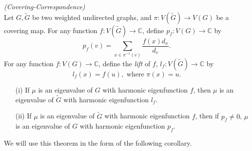 \begin{theorem}\label{thm:cov-cor}
\emph{(Covering-Correspondence)} \\
Let $G, \tilde{G}$ be two weighted undirected graphs, and $\pi : V(\tilde{G}) \to V(G)$ be a covering map.  For any function $f : V(\tilde{G}) \to \mathbb{C}$, define $p_f : V(G) \to \mathbb{C}$ by
 \[ p_f(v) = \displaystyle \sum_{x \in \pi^{-1}(v)} \frac{f(x) d_x}{d_v} . \]
For any function $f : V(G) \to \mathbb{C}$, define the \textit{lift} of $f$, $l_f : V(\tilde{G}) \to \mathbb{C}$ by
 \[ l_f(x) = f(u), \text{ where $\pi(x) = u$}. \]
  
\begin{itemize}
 \item[(i)]  If $\mu$ is an eigenvalue of $G$ with harmonic eigenfunction $f$, then $\mu$ is an eigenvalue of $\tilde{G}$ with harmonic eigenfunction $l_f$.
 \item[(ii)] If $\mu$ is an eigenvalue of $\tilde{G}$ with harmonic eigenfunction $f$, then if $p_f \neq 0$, $\mu$ is an eigenvalue of $G$ with harmonic eigenfunction $p_f$.
\end{itemize}
\end{theorem}

We will use this theorem in the form of the following corollary.

